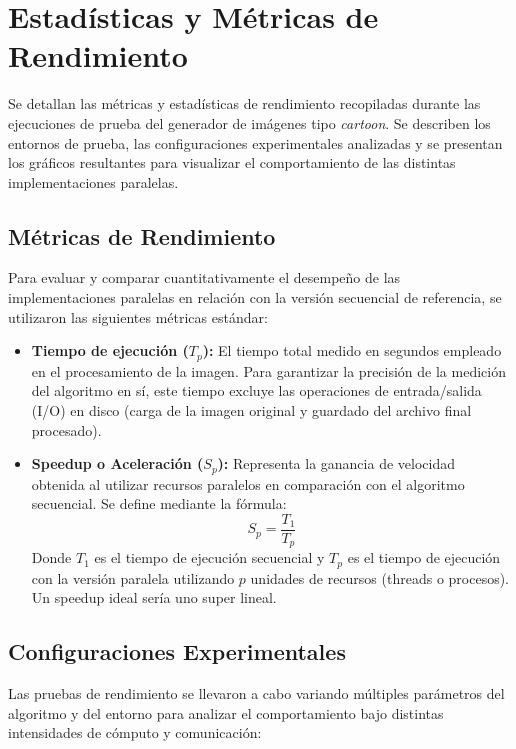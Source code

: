 \chapter{Estadísticas y Métricas de Rendimiento}

Se detallan las métricas y estadísticas de rendimiento recopiladas durante las ejecuciones de prueba del generador de 
imágenes tipo \textit{cartoon}. Se describen los entornos de prueba, las configuraciones experimentales analizadas y se 
presentan los gráficos resultantes para visualizar el comportamiento de las distintas implementaciones paralelas.

\section{Métricas de Rendimiento}

Para evaluar y comparar cuantitativamente el desempeño de las implementaciones paralelas en relación con la versión 
secuencial de referencia, se utilizaron las siguientes métricas estándar:

\begin{itemize}
    \item \textbf{Tiempo de ejecución ($T_p$):} El tiempo total medido en segundos empleado en el procesamiento 
    de la imagen. Para garantizar la precisión de la medición del algoritmo en sí, este tiempo excluye las operaciones 
    de entrada/salida (I/O) en disco (carga de la imagen original y guardado del archivo final procesado).
    
    \item \textbf{Speedup o Aceleración ($S_p$):} Representa la ganancia de velocidad obtenida al utilizar recursos 
    paralelos en comparación con el algoritmo secuencial. Se define mediante la fórmula:
    \[S_p = \frac{T_1}{T_p}\]
    Donde $T_1$ es el tiempo de ejecución secuencial y $T_p$ es el tiempo de ejecución con la versión paralela 
    utilizando $p$ unidades de recursos (threads o procesos). Un speedup ideal sería uno super lineal.
    
\end{itemize}

\section{Configuraciones Experimentales}

Las pruebas de rendimiento se llevaron a cabo variando múltiples parámetros del algoritmo y del entorno para analizar 
el comportamiento bajo distintas intensidades de cómputo y comunicación:


